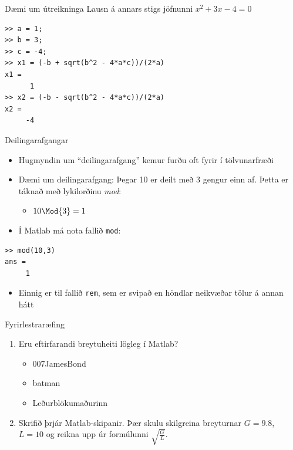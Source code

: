 \documentclass[handout]{beamer}
\begin{document}
\begin{frame}{Dæmi um útreikninga}
\vspace{1cm}
Lausn á annars stigs jöfnunni $x^2 + 3x - 4 = 0$
\begin{verbatim}
>> a = 1;
>> b = 3;
>> c = -4;
>> x1 = (-b + sqrt(b^2 - 4*a*c))/(2*a)
x1 =
      1
>> x2 = (-b - sqrt(b^2 - 4*a*c))/(2*a)
x2 =
     -4
\end{verbatim}
\end{frame}

\begin{frame}[fragile]{Deilingarafgangar}
\begin{itemize}
 \item Hugmyndin um ``deilingarafgang'' kemur furðu oft fyrir í tölvunarfræði
 \item Dæmi um deilingarafgang: Þegar 10 er deilt með 3 gengur einn af. Þetta er táknað með lykilorðinu \emph{mod}:
 \begin{itemize}
  \item $10 \Mod{3} = 1$
 \end{itemize}
 \item Í Matlab má nota fallið \texttt{mod}:
\end{itemize}
\begin{verbatim}
>> mod(10,3)
ans =
     1
\end{verbatim}
\begin{itemize}
 \item Einnig er til fallið \texttt{rem}, sem er svipað en höndlar neikvæðar tölur á annan hátt
\end{itemize}
\end{frame}

\begin{frame}{Fyrirlestraræfing}
    \begin{enumerate}
        \item Eru eftirfarandi breytuheiti lögleg í Matlab?
        \begin{itemize}
            \item 007JamesBond
            \item batman
            \item Leðurblökumaðurinn
        \end{itemize}
        \item Skrifið þrjár Matlab-skipanir. Þær skulu skilgreina breyturnar $G=9.8$, $L=10$ og reikna upp úr formúlunni $\sqrt{\frac{G}{L}}$.
    \end{enumerate}
\end{frame}
\end{document}
